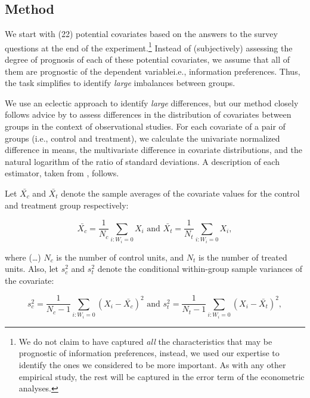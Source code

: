 %

\subsection{Method}

We start with (22) potential covariates based on the answers to the survey questions at the end of the experiment.\footnote{We do not claim to have captured \emph{all} the characteristics that may be prognostic of information preferences, instead, we used our expertise to identify the ones we considered to be more important. As with any other empirical study, the rest will be captured in the error term of the econometric analyses.} Instead of (subjectively) assessing the degree of prognosis of each of these potential covariates, we assume that all of them are prognostic of the dependent variable\textemdash i.e., information preferences. Thus, the task simplifies to identify \emph{large} imbalances between groups.

We use an eclectic approach to identify \emph{large} differences, but our method closely follows advice by \citet{imbensCausalInferenceStatistics2015} to assess differences in the distribution of covariates between groups in the context of observational studies. For each covariate of a pair of groups (i.e., control and treatment), we calculate the univariate normalized difference in means, the multivariate difference in covariate distributions, and the natural logarithm of the ratio of standard deviations. A description of each estimator, taken from \citet{imbensCausalInferenceStatistics2015}, follows.


\begin{displayquote}

Let $\bar{X_c}$ and $\bar{X_t}$ denote the sample averages of the covariate values for the control and treatment group respectively:

\begin{equation*}
  \bar{X_c}=\frac{1}{N_c} \sum_{i:W_i=0} X_i
  \text{  and  }
  \bar{X_t}=\frac{1}{N_t} \sum_{i:W_i=0} X_i,
\end{equation*}

where (\ldots) $N_c$ is the number of control units, and $N_t$ is the number of treated units. Also, let $s_c^2$ and $s_t^2$ denote the conditional within-group sample variances of the covariate:

\begin{equation*}
  s_c^2=\frac{1}{N_c-1} \sum_{i:W_i=0} (X_i-\bar{X_c})^2
  \text{  and  }
  s_t^2=\frac{1}{N_t-1} \sum_{i:W_i=0} (X_i-\bar{X_t})^2,
\end{equation*}

\end{displayquote}

